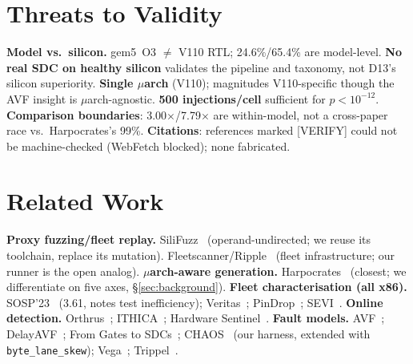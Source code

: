 \documentclass[sigplan,review,anonymous]{acmart}
\begin{document}
\section{Threats to Validity}
\label{sec:threats}
\textbf{Model vs.\ silicon.} gem5~O3 $\neq$ V110 RTL; 24.6\%/65.4\% are model-level. \textbf{No real SDC on healthy silicon} validates the pipeline and taxonomy, not D13's silicon superiority. \textbf{Single \(\mu\)arch} (V110); magnitudes V110-specific though the AVF insight is \(\mu\)arch-agnostic. \textbf{500 injections/cell} sufficient for $p{<}10^{-12}$. \textbf{Comparison boundaries}: 3.00$\times$/7.79$\times$ are within-model, not a cross-paper race vs.\ Harpocrates's 99\%. \textbf{Citations}: references marked [VERIFY] could not be machine-checked (WebFetch blocked); none fabricated.

\section{Related Work}
\label{sec:related}
\textbf{Proxy fuzzing/fleet replay.} SiliFuzz~\cite{silifuzz} (operand-undirected; we reuse its toolchain, replace its mutation). Fleetscanner/Ripple~\cite{fleetscanner_ripple22} (fleet infrastructure; our runner is the open analog). \textbf{\(\mu\)arch-aware generation.} Harpocrates~\cite{harpocrates_isca24,harpocrates_micro26} (closest; we differentiate on five axes, \S\ref{sec:background}). \textbf{Fleet characterisation (all x86).} SOSP'23~\cite{wang_sosp23} (3.61\textperthousand, notes test inefficiency); Veritas~\cite{veritas_hPCA25}; PinDrop~\cite{pindrop_hpca26}; SEVI~\cite{sevi_asplos26}. \textbf{Online detection.} Orthrus~\cite{orthrus_sosp25}; ITHICA~\cite{ithica}; Hardware Sentinel~\cite{hwsentinel_asplos25}. \textbf{Fault models.} AVF~\cite{avf_mukherjee_micro03}; DelayAVF~\cite{delayavf_micro24}; From Gates to SDCs~\cite{gatestosdc_date25}; CHAOS~\cite{chaos_gem5} (our harness, extended with \texttt{byte\_lane\_skew}); Vega~\cite{vega_asplos24}; Trippel~\cite{trippel2021_fuzzhw}.

\end{document}
